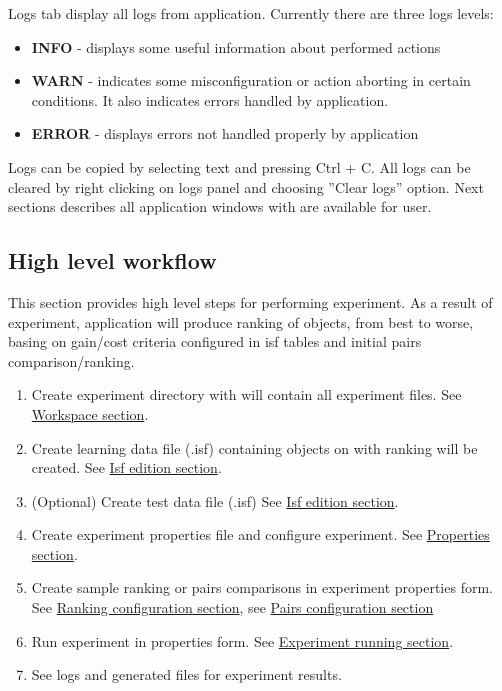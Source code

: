 Logs tab display all logs from application. 
Currently there are three logs levels:
\begin{itemize}
	\item \textbf{INFO} - displays some useful information about performed actions
	\item \textbf{WARN} - indicates some misconfiguration or action aborting in certain conditions. It also indicates errors handled by application.
	\item \textbf{ERROR} - displays errors not handled properly by application
\end{itemize}

Logs can be copied by selecting text and pressing Ctrl + C. All logs can be cleared by right clicking on logs panel and choosing ''Clear logs'' option.
\newline\newline
Next sections describes all application windows with are available for user.

\subsection{High level workflow}\label{sub:overview-flow}

This section provides high level steps for performing experiment. As a result of experiment, application will produce ranking of objects, from best to worse, basing on gain/cost criteria configured in isf tables and initial pairs comparison/ranking.

\begin{enumerate}
	\item Create experiment directory with will contain all experiment files.
	See \hyperref[section:workspace]{Workspace section}.
	\item Create learning data file (.isf) containing objects on with ranking will be created.
	See \hyperref[section:isf-table]{Isf edition section}.
	\item (Optional) Create test data file (.isf)
	See \hyperref[section:isf-table]{Isf edition section}.
	\item Create experiment properties file and configure experiment.
	See \hyperref[section:properties]{Properties section}.
	\item Create sample ranking or pairs comparisons in experiment properties form.
	See \hyperref[sub:properties-ranking]{Ranking configuration section},
	see \hyperref[sub:properties-pairs]{Pairs configuration section}
	\item Run experiment in properties form.
	See \hyperref[section:experiment-running]{Experiment running section}.
	\item See logs and generated files for experiment results.
\end{enumerate}

